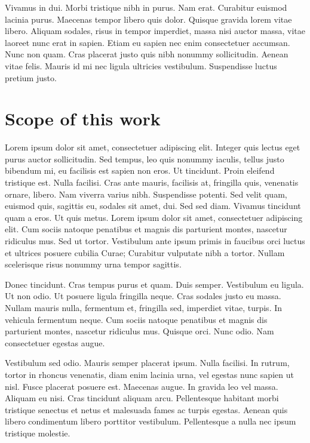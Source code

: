 Vivamus in dui. Morbi tristique nibh in purus. Nam erat. Curabitur euismod lacinia purus. Maecenas tempor libero quis dolor. Quisque gravida lorem vitae libero. Aliquam sodales, risus in tempor imperdiet, massa nisi auctor massa, vitae laoreet nunc erat in sapien. Etiam eu sapien nec enim consectetuer accumsan. Nunc non quam. Cras placerat justo quis nibh nonummy sollicitudin. Aenean vitae felis. Mauris id mi nec ligula ultricies vestibulum. Suspendisse luctus pretium justo.

\section{Scope of this work}
\label{ch:eingrenzungThema}
Lorem ipsum dolor sit amet, consectetuer adipiscing elit. Integer quis lectus eget purus auctor sollicitudin. Sed tempus, leo quis nonummy iaculis, tellus justo bibendum mi, eu facilisis est sapien non eros. Ut tincidunt. Proin eleifend tristique est. Nulla facilisi. Cras ante mauris, facilisis at, fringilla quis, venenatis ornare, libero. Nam viverra varius nibh. Suspendisse potenti. Sed velit quam, euismod quis, sagittis eu, sodales sit amet, dui. Sed sed diam. Vivamus tincidunt quam a eros. Ut quis metus. Lorem ipsum dolor sit amet, consectetuer adipiscing elit. Cum sociis natoque penatibus et magnis dis parturient montes, nascetur ridiculus mus. Sed ut tortor. Vestibulum ante ipsum primis in faucibus orci luctus et ultrices posuere cubilia Curae; Curabitur vulputate nibh a tortor. Nullam scelerisque risus nonummy urna tempor sagittis.

Donec tincidunt. Cras tempus purus et quam. Duis semper. Vestibulum eu ligula. Ut non odio. Ut posuere ligula fringilla neque. Cras sodales justo eu massa. Nullam mauris nulla, fermentum et, fringilla sed, imperdiet vitae, turpis. In vehicula fermentum neque. Cum sociis natoque penatibus et magnis dis parturient montes, nascetur ridiculus mus. Quisque orci. Nunc odio. Nam consectetuer egestas augue.

Vestibulum sed odio. Mauris semper placerat ipsum. Nulla facilisi. In rutrum, tortor in rhoncus venenatis, diam enim lacinia urna, vel egestas nunc sapien ut nisl. Fusce placerat posuere est. Maecenas augue. In gravida leo vel massa. Aliquam eu nisi. Cras tincidunt aliquam arcu. Pellentesque habitant morbi tristique senectus et netus et malesuada fames ac turpis egestas. Aenean quis libero condimentum libero porttitor vestibulum. Pellentesque a nulla nec ipsum tristique molestie.

